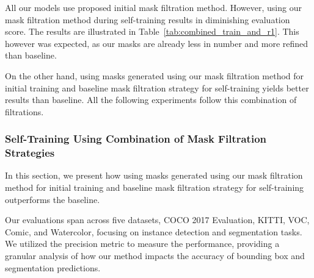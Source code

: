 \begin{table}[htbp]
	\centering
	\caption[\textbf{\(AP_{box}\) and \(AP50_{box}\) for Training and First Self-Training Round}]{\textbf{\(AP_{box}\) and \(AP50_{box}\) for Training and Self-Training} evaluated on COCO validation set (Batch size 8) for model trained using our mask filtration for self-training}
	\label{tab:combined_train_and_r1}
\end{table}

All our models use proposed initial mask filtration method. However, using our mask filtration method during self-training results in diminishing evaluation score. The results are illustrated in Table~\ref{tab:combined_train_and_r1}. This however was expected, as our masks are already less in number and more refined than baseline.

On the other hand, using masks generated using our mask filtration method for initial training and baseline mask filtration strategy for self-training yields better results than baseline. All the following experiments follow this combination of filtrations.

\subsubsection{Self-Training Using Combination of Mask Filtration Strategies}

In this section, we present how using masks generated using our mask filtration method for initial training and baseline mask filtration strategy for self-training outperforms the baseline. 

Our evaluations span across five datasets, COCO 2017 Evaluation, KITTI, VOC, Comic, and Watercolor, focusing on instance detection and segmentation tasks. We utilized the precision metric to measure the performance, providing a granular analysis of how our method impacts the accuracy of bounding box and segmentation predictions.

